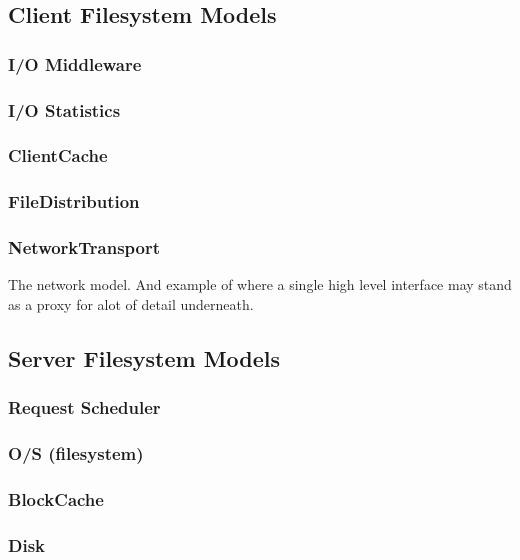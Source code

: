 \documentclass[11pt]{article}
\begin{document}
\subsection{Client Filesystem Models}

\subsubsection{I/O Middleware}

\subsubsection{I/O Statistics}

\subsubsection{ClientCache}

\subsubsection{FileDistribution}

\subsubsection{NetworkTransport}
The network model.  And example of where a single high level interface may
stand as a proxy for alot of detail underneath.

\subsection{Server Filesystem Models}

\subsubsection{Request Scheduler}

\subsubsection{O/S (filesystem)}

\subsubsection{BlockCache}

\subsubsection{Disk}
\end{document}
